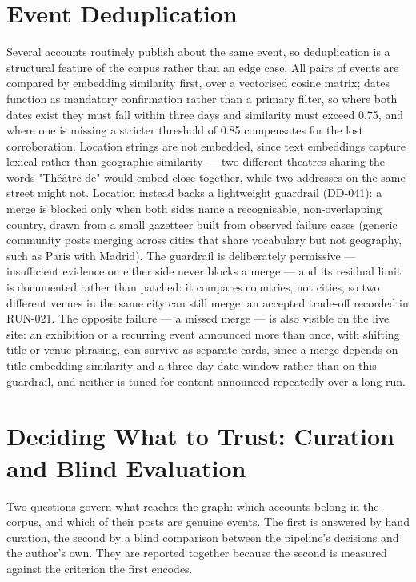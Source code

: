 \documentclass[12pt, a4paper]{report}
\begin{document}
\section{Event Deduplication}
\label{sec:event-resolver}

Several accounts routinely publish about the same event, so deduplication
is a structural feature of the corpus rather than an edge case. All pairs
of events are compared by embedding similarity first, over a vectorised
cosine matrix; dates function as mandatory confirmation rather than a
primary filter, so where both dates exist they must fall within three
days and similarity must exceed 0.75, and where one is missing a
stricter threshold of 0.85 compensates for the lost corroboration.
Location strings are not embedded, since text embeddings capture lexical
rather than geographic similarity — two different theatres sharing the
words "Théâtre de" would embed close together, while two addresses on the
same street might not. Location instead backs a lightweight guardrail
(DD-041): a merge is blocked only when both sides name a recognisable,
non-overlapping country, drawn from a small gazetteer built from observed
failure cases (generic community posts merging across cities that share
vocabulary but not geography, such as Paris with Madrid). The guardrail
is deliberately permissive — insufficient evidence on either side never
blocks a merge — and its residual limit is documented rather than
patched: it compares countries, not cities, so two different venues in
the same city can still merge, an accepted trade-off recorded in
RUN-021. The opposite failure — a missed merge — is also visible on the
live site: an exhibition or a recurring event announced more than once,
with shifting title or venue phrasing, can survive as separate cards,
since a merge depends on title-embedding similarity and a three-day
date window rather than on this guardrail, and neither is tuned for
content announced repeatedly over a long run.

\section{Deciding What to Trust: Curation and Blind Evaluation}
\label{sec:trust}

Two questions govern what reaches the graph: which accounts belong in
the corpus, and which of their posts are genuine events. The first is
answered by hand curation, the second by a blind comparison between the
pipeline's decisions and the author's own. They are reported together
because the second is measured against the criterion the first encodes.
\end{document}
